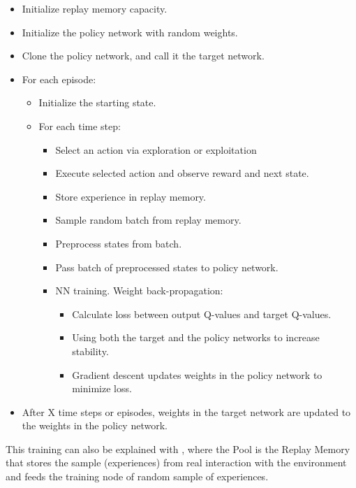			\begin{itemize}
				\item[\textendash]Initialize replay memory capacity.
				\item[\textendash]Initialize the policy network with random weights.
				\item[\textendash]Clone the policy network, and call it the target network.
				\item[\textendash]For each episode:
				\begin{itemize}
					\item[\textendash]Initialize the starting state.
					\item[\textendash]For each time step:
					\begin{itemize}
						\item[\textendash]Select an action via exploration or exploitation
						\item[\textendash]Execute selected action and observe reward and next state.
						\item[\textendash]Store experience in replay memory.
						\item[\textendash]Sample random batch from replay memory.
						\item[\textendash]Preprocess states from batch.
						\item[\textendash]Pass batch of preprocessed states to policy network.
						\item[\textendash]NN training. Weight back-propagation:
						\begin{itemize}
							\item[\textendash]Calculate loss between output Q-values and target Q-values.
							\item[\textendash]Using both the target and the policy networks to increase stability.
							\item[\textendash]Gradient descent updates weights in the policy network to minimize loss.
						\end{itemize}
						
					\end{itemize}
				\end{itemize}
				\item[\textendash]After X time steps or episodes, weights in the target network are updated to the weights in the policy network.
			\end{itemize}
			
			This training can also be explained with \autocite{fig:training}, where the Pool is the Replay Memory that stores the sample (experiences) from real interaction with the environment and feeds the training node of random sample of experiences.
			

